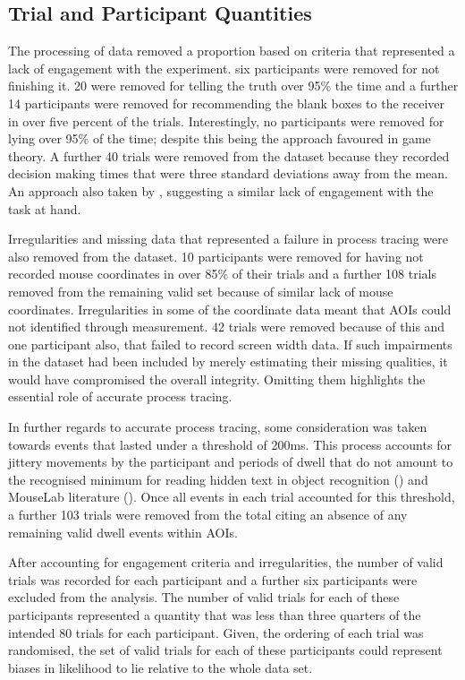 \documentclass[man, floatsintext]{apa7}
\begin{document}
\subsection{Trial and Participant Quantities}
\label{subsec:quantities}
The processing of data removed a proportion based on criteria that represented a lack of engagement with the experiment. six participants were removed for not finishing it. 20 were removed for telling the truth over 95\% the time and a further 14 participants were removed for recommending the blank boxes to the receiver in over five percent of the trials.  Interestingly, no participants were removed for lying over 95\% of the time; despite this being the approach favoured in game theory.  A further 40 trials were removed from the dataset because they recorded decision making times that were three standard deviations away from the mean. An approach also taken by \citeauthor{reeckSearchPredictsChanges2017b}, suggesting a similar lack of engagement with the task at hand.

Irregularities and missing data that represented a failure in process tracing were also removed from the dataset. 10 participants were removed for having not recorded mouse coordinates in over 85\% of their trials and a further 108 trials removed from the remaining valid set because of similar lack of mouse coordinates. Irregularities in some of the coordinate data meant that AOIs could not identified through measurement. 42 trials were removed because of this and one participant also, that failed to record screen width data. If such impairments in the dataset had been included by merely estimating their missing qualities, it would have compromised the overall integrity. Omitting them highlights the essential role of accurate process tracing.

In further regards to accurate process tracing, some consideration was taken towards events that lasted under a threshold of 200ms. This process accounts for jittery movements by the participant and periods of dwell that do not amount to the recognised minimum for reading hidden text in object recognition (\cite{dicarloHowDoesBrain2012}) and MouseLab literature (\cite{willemsenVisitingDecisionFactory2011}). Once all events in each trial accounted for this threshold, a further 103 trials were removed from the total citing an absence of any remaining valid dwell events within AOIs. 

After accounting for engagement criteria and irregularities, the number of valid trials was recorded for each participant and a further six participants were excluded from the analysis. The number of valid trials for each of these participants represented a quantity that was less than three quarters of the intended 80 trials for each participant. Given, the ordering of each trial was randomised, the set of valid trials for each of these participants could represent biases in likelihood to lie relative to the whole data set.
\end{document}
